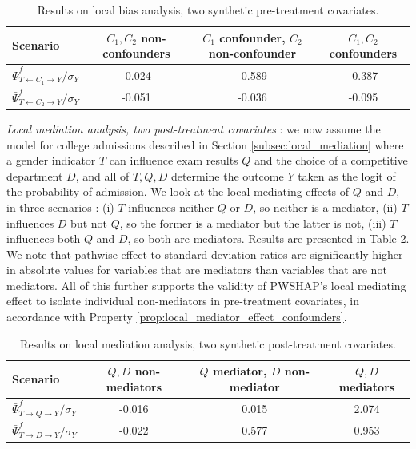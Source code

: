 \documentclass{article}
\theoremstyle{plain}
\theoremstyle{definition}
\theoremstyle{remark}
\newcommand{\effect}{\Psi}
\theoremstyle{mystyle}
\begin{document}
    
\begin{table}
\begin{tabular}{lccc}
\hline
Scenario & $C_1, C_2$ non-confounders & \makecell{$C_1$ confounder,\\$C_2$ non-confounder} & $C_1, C_2$ confounders \\ \hline
 $\bar{\effect}^f_{T \leftarrow C_1 \rightarrow Y} / \sigma_Y$ & -0.024 & -0.589 & -0.387 \\ \hline
 $\bar{\effect}^f_{T \leftarrow C_2 \rightarrow Y} / \sigma_Y$ & -0.051 & -0.036 & -0.095 \\
\end{tabular}
  \caption{Results on local bias analysis, two synthetic pre-treatment covariates. %
  }%
\label{tab:synthetic_xp_localbias_twovars}
\end{table}

\textit{Local mediation analysis, two post-treatment covariates} : we now assume the model for college admissions described in Section \ref{subsec:local_mediation} where a gender indicator $T$ can influence exam results $Q$ and the choice of a competitive department $D$, and all of $T, Q, D$ determine the outcome $Y$ taken as the logit of the probability of admission. We look at the local mediating effects of $Q$ and $D$, in three scenarios : (i) $T$ influences neither $Q$ or $D$, so neither is a mediator, (ii) $T$ influences $D$ but not $Q$, so the former is a mediator but the latter is not, (iii) $T$ influences both $Q$ and $D$, so both are mediators. Results are presented in Table \ref{tab:synthetic_xp_localmediation_twovars}. We note that pathwise-effect-to-standard-deviation ratios are significantly higher in absolute values for variables that are mediators than variables that are not mediators. All of this further supports the validity of PWSHAP's local mediating effect to isolate individual non-mediators in pre-treatment covariates, in accordance with Property \ref{prop:local_mediator_effect_confounders}.
    
\begin{table}
\begin{tabular}{lccc}
\hline
Scenario & $Q, D$ non-mediators & \makecell{$Q$ mediator,\\$D$ non-mediator} & $Q, D$ mediators \\ \hline
 $\bar{\effect}^f_{T \rightarrow Q \rightarrow Y} / \sigma_Y$ & -0.016 & 0.015 & 2.074 \\ \hline
 $\bar{\effect}^f_{T \rightarrow D \rightarrow Y} / \sigma_Y$ & -0.022 & 0.577 & 0.953 \\
\end{tabular}
  \caption{Results on local mediation analysis, two synthetic post-treatment covariates. %
  }%
\label{tab:synthetic_xp_localmediation_twovars}
\end{table}
\end{document}

